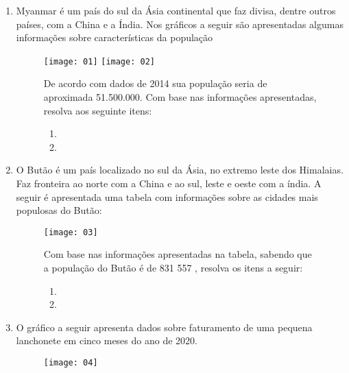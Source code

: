 \documentclass[oneside,a4paper,12pt]{article}
\begin{document}
\begin{enumerate}
\item Myanmar é um país do sul da Ásia continental que faz divisa, dentre outros países, com a China e  a Índia. Nos gráficos a seguir são apresentadas algumas informações sobre características da população 

\begin{figure}[!hbt]
\begin{multicols}{2}
\texttt{[image: 01]}
\texttt{[image: 02]}

De acordo com dados de 2014 sua população seria de aproximada 51.500.000. Com base nas informações apresentadas, resolva aos seguinte itens:
\begin{enumerate}
\item 

\item 
\end{enumerate}

\end{multicols}
\end{figure}

\item O Butão é um país localizado no sul da Ásia, no extremo leste dos Himalaias. Faz fronteira ao norte com a China e ao sul, leste e oeste com a índia. A seguir é apresentada uma tabela com informações sobre as cidades mais populosas do Butão:

\begin{figure}[!hbt]
\begin{multicols}{2}
\texttt{[image: 03]}

\columnbreak
Com base nas informações apresentadas na tabela, sabendo que a população do Butão é de 831 557 , resolva os itens a seguir:
\begin{enumerate}
\item 

\item 
\end{enumerate}

\end{multicols}
\end{figure}

\newpage
\item O gráfico a seguir apresenta dados sobre faturamento de uma pequena lanchonete em cinco meses do ano de 2020.

\begin{figure}[!hbt]
\begin{multicols}{2}
\texttt{[image: 04]}


\end{multicols}
\end{figure}
\end{enumerate}
\end{document}

